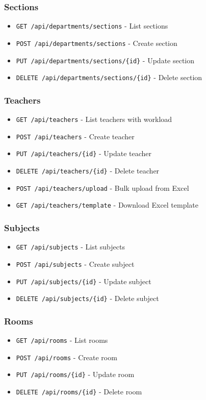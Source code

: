 \documentclass[12pt,a4paper]{article}
\begin{document}
\subsubsection{Sections}
\begin{itemize}
    \item \texttt{GET /api/departments/sections} - List sections
    \item \texttt{POST /api/departments/sections} - Create section
    \item \texttt{PUT /api/departments/sections/\{id\}} - Update section
    \item \texttt{DELETE /api/departments/sections/\{id\}} - Delete section
\end{itemize}

\subsubsection{Teachers}
\begin{itemize}
    \item \texttt{GET /api/teachers} - List teachers with workload
    \item \texttt{POST /api/teachers} - Create teacher
    \item \texttt{PUT /api/teachers/\{id\}} - Update teacher
    \item \texttt{DELETE /api/teachers/\{id\}} - Delete teacher
    \item \texttt{POST /api/teachers/upload} - Bulk upload from Excel
    \item \texttt{GET /api/teachers/template} - Download Excel template
\end{itemize}

\subsubsection{Subjects}
\begin{itemize}
    \item \texttt{GET /api/subjects} - List subjects
    \item \texttt{POST /api/subjects} - Create subject
    \item \texttt{PUT /api/subjects/\{id\}} - Update subject
    \item \texttt{DELETE /api/subjects/\{id\}} - Delete subject
\end{itemize}

\subsubsection{Rooms}
\begin{itemize}
    \item \texttt{GET /api/rooms} - List rooms
    \item \texttt{POST /api/rooms} - Create room
    \item \texttt{PUT /api/rooms/\{id\}} - Update room
    \item \texttt{DELETE /api/rooms/\{id\}} - Delete room
\end{itemize}
\end{document}
